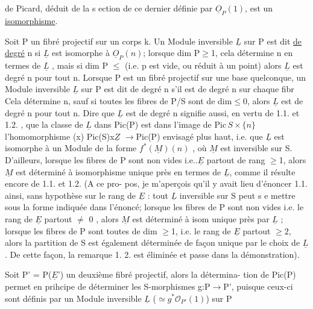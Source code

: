 de Picard, déduit de la s ection de ce dernier définie par $\underline{O}_P(1)$, est un
\uline{isomorphisme}.

Soit P un fibré projectif sur un corps k. Un Module inversible
$\underline{L}$ sur P est dit \uline{de degré} n si $\underline{L}$ est isomorphe à $\underline{O}_P(n)$; lorsque
dim P$\geq$1, cela détermine n en termes de $\underline{L}$ , mais si dim P $\leq$ 
(i.e. p est vide, ou réduit à un point) alors $\underline{L}$ est degré n pour tout n.
Lorsque P est un fibré projectif sur une base quelconque, un Module
inversible $\underline{L}$ sur P est dit de degré n s'il est de degré n sur chaque fibr
Cela détermine n, sauf si toutes les fibres de P/S sont de dim$\leq$0, alors
$\underline{L}$ est de degré n pour tout n. Dire que $\underline{L}$ est de degré n signifie aussi,
en vertu de 1.1. et 1.2. , que la classe  de $\underline{L}$ dans Pic(P) est dans
l'image de $\mathrm{Pic}\,S\times\{n\}$  l'homomorphisme (x) Pic(S)x$\underline{Z}$ $\longrightarrow$Pic(P) envisagé plus haut,
i.e. que $\underline{L}$ est isomorphe à un Module de la forme $f^*(\underline{M})(n)$ , où $\underline{M}$ est
inversible sur S. D'ailleurs, lorsque les fibres de P sont non vides
i.e..$\underline{E}$ partout de rang $\geq$1, alors $\underline{M}$ est déterminé à isomorphisme unique
\placedmargin{\textbar}près en termes de $\underline{L}$, comme il résulte encore de 1.1. et 1.2. (A ce pro-%
pos, je m'aperçois qu'il y avait lieu d'énoncer 1.1. ainsi, sans hypothèse
sur le rang de $\underline{E}$ : tout $\underline{L}$ inversible sur S peut s e mettre sous la forme
indiquée dans l'énoncé; lorsque les fibres de P sont non vides i.e. le
rang de $\underline{E}$ partout $\neq$ 0 , alors $\underline{M}$ est déterminé à isom unique près par
$\underline{L}$ ; lorsque les fibres de P sont toutes de dim $\geq$1, i.e. le rang de $\underline{E}$ partout $\geq 2$, alors la partition
de S est également déterminée de façon unique par le choix de $\underline{L}$. De cette
façon, la remarque 1. 2. est éliminée et passe dans la démonstration).

Soit P' = P($\underline{E}$') un deuxième fibré projectif, alors la détermina-%
tion de Pic(P) permet en prihcipe de déterminer les S-morphismes
g:P$\to$P', puisque ceux-ci sont définis par un Module inversible $\underline{L}$ ($\simeq g^*\mathcal{O}_{P'}(1)$) sur P

